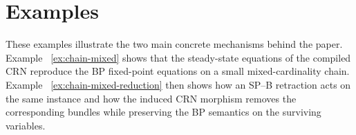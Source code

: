 \documentclass{article}
\theoremstyle{plain}
\theoremstyle{definition}
\theoremstyle{remark}
\newtheorem{example}{Example}[section]
\newcommand{\Cat}{\textrm{Cat}}
\newcommand{\<}{\langle}
\renewcommand{\>}{\rangle}
\begin{document}
\section{Examples}
These examples illustrate the two main concrete mechanisms behind the paper. Example ~\ref{ex:chain-mixed} shows that the steady-state equations of the compiled CRN reproduce the BP fixed-point equations on a small mixed-cardinality chain. Example ~\ref{ex:chain-mixed-reduction} then shows how an SP–B retraction acts on the same instance and how the induced CRN morphism removes the corresponding bundles while preserving the BP semantics on the surviving variables.

\end{document}
